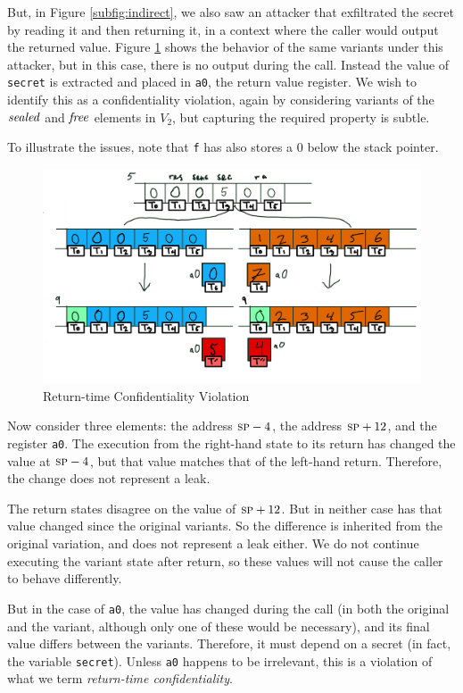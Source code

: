 \documentclass[10pt,conference]{ieeetran}%
\theoremstyle{definition}
\begin{document}
But, in Figure \ref{subfig:indirect}, we also saw an attacker that exfiltrated the secret
by reading it and then returning it, in a context where the caller would output the returned
value. Figure \ref{fig:variant3} shows the behavior of the same variants under this attacker,
but in this case, there is no output during the call. Instead the value of {\tt secret} is
extracted and placed in {\tt a0}, the return value register. We wish to identify this as
a confidentiality violation, again by considering variants of the \(\mathit{sealed}\) and \(\mathit{free}\)
elements in \(V_2\), but capturing the required property is subtle.  

To illustrate the issues, note that {\tt f} has also stores a 0 below the stack pointer.
%
\begin{figure}
  \includegraphics[width=\columnwidth]{variants3.png}
  \caption{Return-time Confidentiality Violation}
  \label{fig:variant3}
\end{figure}
%
Now consider three elements: the address \(\textsc{sp} - 4\), the address \(\textsc{sp} + 12\),
and the register {\tt a0}. The execution from the right-hand state to its return
has changed the value at \(\textsc{sp} - 4\), but that value matches that of the
left-hand return. Therefore, the change does not represent a leak.

The return states disagree on the value of \(\textsc{sp} + 12\). But in neither
case has that value changed since the original variants. So the difference is inherited from
the original variation, and does not represent a leak either. We do not continue executing the
variant state after return, so these values will not cause the caller to behave differently.

But in the case of {\tt a0}, the value has changed during the call (in both the original
and the variant, although only one of these would be necessary), and its final value
differs between the variants.
Therefore, it must depend on a secret (in fact, the variable {\tt secret}).
Unless {\tt a0} happens to be irrelevant, this is a violation of what
we term {\it return-time confidentiality}.
\end{document}
